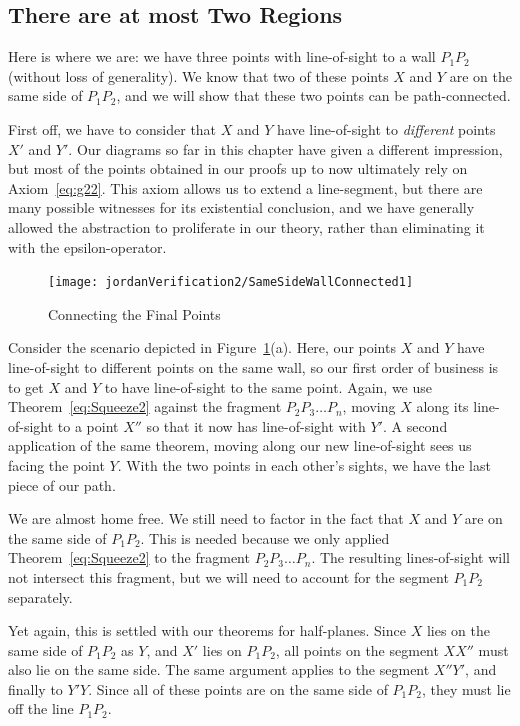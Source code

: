 \subsection{There are at most Two Regions}\label{sec:SameSideWallConnected}
Here is where we are: we have three points with line-of-sight to a wall $P_1P_2$ (without loss of generality). We know that two of these points $X$ and $Y$ are on the same side of $P_1P_2$, and we will show that these two points can be path-connected.

First off, we have to consider that $X$ and $Y$ have line-of-sight to \emph{different} points $X'$ and $Y'$. Our diagrams so far in this chapter have given a different impression, but most of the points obtained in our proofs up to now ultimately rely on Axiom~\ref{eq:g22}. This axiom allows us to extend a line-segment, but there are many possible witnesses for its existential conclusion, and we have generally allowed the abstraction to proliferate in our theory, rather than eliminating it with the epsilon-operator. 

\begin{figure}
\centering\texttt{[image: jordanVerification2/SameSideWallConnected1]}
\caption{Connecting the Final Points}
\label{fig:SameSideWallConnected}
\end{figure}

Consider the scenario depicted in Figure~\ref{fig:SameSideWallConnected}(a). Here, our points $X$ and $Y$ have line-of-sight to different points on the same wall, so our first order of business is to get $X$ and $Y$ to have line-of-sight to the same point. Again, we use Theorem~\ref{eq:Squeeze2} against the fragment $P_2P_3\ldots P_n$, moving $X$ along its line-of-sight to a point $X''$ so that it now has line-of-sight with $Y'$. A second application of the same theorem, moving along our new line-of-sight sees us facing the point $Y$. With the two points in each other's sights, we have the last piece of our path.

We are almost home free. We still need to factor in the fact that $X$ and $Y$ are on the same side of $P_1P_2$. This is needed because we only applied Theorem~\ref{eq:Squeeze2} to the fragment $P_2P_3\ldots P_n$. The resulting lines-of-sight will not intersect this fragment, but we will need to account for the segment $P_1P_2$ separately.

Yet again, this is settled with our theorems for half-planes. Since $X$ lies on the same side of $P_1P_2$ as $Y$, and $X'$ lies on $P_1P_2$, all points on the segment $XX''$ must also lie on the same side. The same argument applies to the segment $X''Y'$, and finally to $Y'Y$. Since all of these points are on the same side of $P_1P_2$, they must lie off the line $P_1P_2$. 

